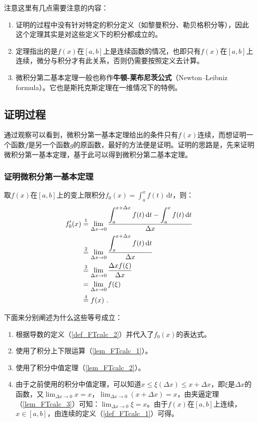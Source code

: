 注意这里有几点需要注意的内容：
\begin{enumerate}
\item 证明的过程中没有针对特定的积分定义（如黎曼积分、勒贝格积分等），因此这个定理其实是对这些定义下的积分都成立的。
\item 定理指出的是$f(x)$在$[a,b]$上是连续函数的情况，也即只有$f(x)$在$[a,b]$上连续，微分与积分才有此关系，否则仍需要按照定义去计算。
\item 微积分第二基本定理一般也称作\textbf{牛顿-莱布尼茨公式}（Newton–Leibniz formula）。它也是斯托克斯定理在一维情况下的特例。
\end{enumerate}

\subsection{证明过程}

通过观察可以看到，微积分第一基本定理给出的条件只有$f(x)$连续，而想证明一个函数$f$是另一个函数$g$的原函数，最好的方法便是证明。证明的思路是，先来证明微积分第一基本定理，基于此可以得到微积分第二基本定理。

\subsubsection{证明微积分第一基本定理}

取$f(x)$在$[a,b]$上的变上限积分$f_0(x)=\int_{a}^{x} f(t)\, \mathrm {d}t$，则：
$$\begin{align*}\displaystyle f_0'(x) &\overset{\mathrm{1}}{=} \lim_{\Delta x\to0}{\displaystyle\int_{a}^{x+\Delta x} f(t)\, \mathrm {d}t-\displaystyle\int_{a}^{x} f(t)\, \mathrm {d}t\over\Delta x}\\ 
&\overset{\mathrm{2}}{=}\lim_{\Delta x\to0}{\displaystyle\int_{x}^{x+\Delta x} f(t)\, \mathrm {d}t\over\Delta x}\\
&\overset{\mathrm{3}}{=}\lim_{\Delta x\to0}{\Delta xf(\xi)\over\Delta x} \\ 
&=\lim_{\Delta x\to0}f(\xi)\\ 
&\overset{\mathrm{4}}{=}f(x)~.\end{align*}$$

下面来分别阐述为什么这些等号成立：
\begin{enumerate}
\item 根据导数的定义（\autoref{def_FTcalc_2}）并代入了$f_0(x)$的表达式。
\item 使用了积分上下限运算（\autoref{lem_FTcalc_1}）。
\item 使用了积分中值定理（\autoref{lem_FTcalc_2}）。
\item 由于之前使用的积分中值定理，可以知道$x\leq\xi(\Delta x)\leq x+\Delta x$，即$\xi$是$\Delta x$的函数，又$\lim_{\Delta x\to0}x=x$，$\lim_{\Delta x\to0}(x+\Delta x)=x$，由夹逼定理（\autoref{lem_FTcalc_3}）可知：$\lim_{\Delta x\to0}\xi=x$。由于$f(x)$在$[a,b]$上连续，$x\in[a,b]$，由连续的定义（\autoref{def_FTcalc_1}）可得。
\end{enumerate}

